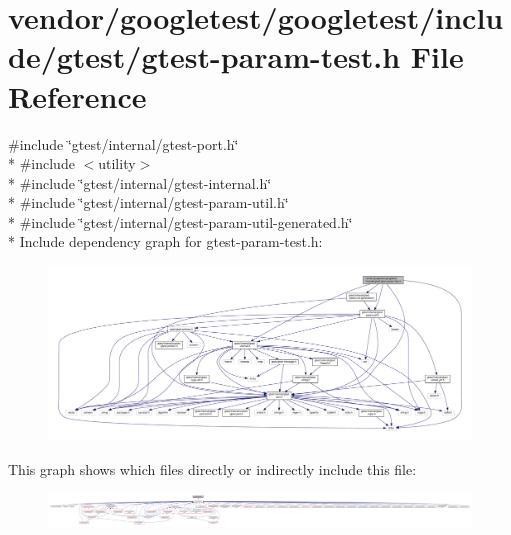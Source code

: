\hypertarget{gtest-param-test_8h}{}\section{vendor/googletest/googletest/include/gtest/gtest-\/param-\/test.h File Reference}
\label{gtest-param-test_8h}
{\ttfamily \#include \char`\"{}gtest/internal/gtest-\/port.\+h\char`\"{}}\\*
{\ttfamily \#include $<$utility$>$}\\*
{\ttfamily \#include \char`\"{}gtest/internal/gtest-\/internal.\+h\char`\"{}}\\*
{\ttfamily \#include \char`\"{}gtest/internal/gtest-\/param-\/util.\+h\char`\"{}}\\*
{\ttfamily \#include \char`\"{}gtest/internal/gtest-\/param-\/util-\/generated.\+h\char`\"{}}\\*
Include dependency graph for gtest-\/param-\/test.h\+:\nopagebreak
\begin{figure}[H]
\begin{center}
\leavevmode
\includegraphics[width=350pt]{gtest-param-test_8h__incl}
\end{center}
\end{figure}
This graph shows which files directly or indirectly include this file\+:\nopagebreak
\begin{figure}[H]
\begin{center}
\leavevmode
\includegraphics[width=350pt]{gtest-param-test_8h__dep__incl}
\end{center}
\end{figure}
